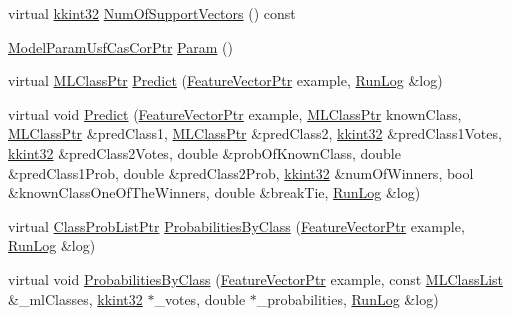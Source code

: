 \begin{DoxyCompactItemize}
\item 
virtual \hyperlink{namespace_k_k_b_a8fa4952cc84fda1de4bec1fbdd8d5b1b}{kkint32} \hyperlink{class_k_k_m_l_l_1_1_model_usf_cas_cor_ae0f09061e11b9a98d5e8256cc9f2e0fb}{Num\+Of\+Support\+Vectors} () const 
\item 
\hyperlink{namespace_k_k_m_l_l_aa344d19d8e93c3923eb2c82bc999e9c5}{Model\+Param\+Usf\+Cas\+Cor\+Ptr} \hyperlink{class_k_k_m_l_l_1_1_model_usf_cas_cor_afbbbaefcdf95602a219842f991e040f2}{Param} ()
\item 
virtual \hyperlink{namespace_k_k_m_l_l_ac272393853d59e72e8456f14cd6d8c23}{M\+L\+Class\+Ptr} \hyperlink{class_k_k_m_l_l_1_1_model_usf_cas_cor_a07c63cd242c0c1a8d305f639339be534}{Predict} (\hyperlink{namespace_k_k_m_l_l_a0c5df3d48f45926fbc4fee04f5e3bc04}{Feature\+Vector\+Ptr} example, \hyperlink{class_k_k_b_1_1_run_log}{Run\+Log} \&log)
\item 
virtual void \hyperlink{class_k_k_m_l_l_1_1_model_usf_cas_cor_a0f24a06c9f2367e4841a472ae966ff7f}{Predict} (\hyperlink{namespace_k_k_m_l_l_a0c5df3d48f45926fbc4fee04f5e3bc04}{Feature\+Vector\+Ptr} example, \hyperlink{namespace_k_k_m_l_l_ac272393853d59e72e8456f14cd6d8c23}{M\+L\+Class\+Ptr} known\+Class, \hyperlink{namespace_k_k_m_l_l_ac272393853d59e72e8456f14cd6d8c23}{M\+L\+Class\+Ptr} \&pred\+Class1, \hyperlink{namespace_k_k_m_l_l_ac272393853d59e72e8456f14cd6d8c23}{M\+L\+Class\+Ptr} \&pred\+Class2, \hyperlink{namespace_k_k_b_a8fa4952cc84fda1de4bec1fbdd8d5b1b}{kkint32} \&pred\+Class1\+Votes, \hyperlink{namespace_k_k_b_a8fa4952cc84fda1de4bec1fbdd8d5b1b}{kkint32} \&pred\+Class2\+Votes, double \&prob\+Of\+Known\+Class, double \&pred\+Class1\+Prob, double \&pred\+Class2\+Prob, \hyperlink{namespace_k_k_b_a8fa4952cc84fda1de4bec1fbdd8d5b1b}{kkint32} \&num\+Of\+Winners, bool \&known\+Class\+One\+Of\+The\+Winners, double \&break\+Tie, \hyperlink{class_k_k_b_1_1_run_log}{Run\+Log} \&log)
\item 
virtual \hyperlink{namespace_k_k_m_l_l_a60f96a524ddb189eff2b4391cf0b651c}{Class\+Prob\+List\+Ptr} \hyperlink{class_k_k_m_l_l_1_1_model_usf_cas_cor_add4f86cc82b119a8b7fd15bb8d28918a}{Probabilities\+By\+Class} (\hyperlink{namespace_k_k_m_l_l_a0c5df3d48f45926fbc4fee04f5e3bc04}{Feature\+Vector\+Ptr} example, \hyperlink{class_k_k_b_1_1_run_log}{Run\+Log} \&log)
\item 
virtual void \hyperlink{class_k_k_m_l_l_1_1_model_usf_cas_cor_ac6c85f944e8e62df5a1b39a2f1418abc}{Probabilities\+By\+Class} (\hyperlink{namespace_k_k_m_l_l_a0c5df3d48f45926fbc4fee04f5e3bc04}{Feature\+Vector\+Ptr} example, const \hyperlink{class_k_k_m_l_l_1_1_m_l_class_list}{M\+L\+Class\+List} \&\+\_\+ml\+Classes, \hyperlink{namespace_k_k_b_a8fa4952cc84fda1de4bec1fbdd8d5b1b}{kkint32} $\ast$\+\_\+votes, double $\ast$\+\_\+probabilities, \hyperlink{class_k_k_b_1_1_run_log}{Run\+Log} \&log)

\end{DoxyCompactItemize}

